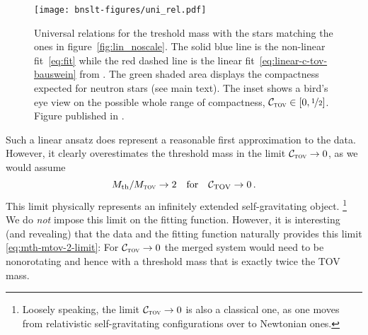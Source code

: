 \begin{figure}[t]
	\texttt{[image: bnslt-figures/uni\_rel.pdf]}
	\caption[
      Universal relations plot, 
	]{Universal relations for the treshold mass with the stars matching
	  the ones in figure~\protect\ref{fig:lin_noscale}. The solid blue line is
	  the non-linear fit~\protect\ref{eq:fit} while the red dashed line
	  is the linear fit~\protect\ref{eq:linear-c-tov-bauswein} from
	  \cite{Bauswein2013}. The green shaded area displays the compactness
	  expected for neutron stars (see main text).
	  The inset shows a bird's eye view on the possible whole range of
	  compactness, \ie $\mathcal{C}_{\textsc{tov}}\in[0, \nicefrac 12]$.
	  Figure published in \cite{Koeppel2019}.
	}
	\label{fig:uni_rel}
\end{figure}

Such a linear ansatz does represent a reasonable first approximation to
the data.  However, it clearly overestimates the threshold mass in the
limit $\mathcal{C}_{\textsc{tov}}\to0$, as we would assume
\begin{equation}\label{eq:mth-mtov-2-limit}
M_\textrm{th} / M_{\textsc{tov}} \to 2 \quad\text{for}\quad \mathcal{C}_{\rm{TOV}} \to 0 \,.
\end{equation}
This limit physically represents an infinitely extended self-gravitating
object. \footnote{
  Loosely speaking, the limit $\mathcal C_{\textsc{tov}} \to 0$ is also a
  classical one, as one moves from relativistic self-gravitating
  configurations over to Newtonian ones.
}
We do \emph{not} impose this limit on the fitting function. However, it
is interesting (and revealing) that the data and the
fitting function naturally provides this limit \eqref{eq:mth-mtov-2-limit}:
For $\mathcal C_{\textsc{tov}} \to 0$ the merged system would need to be nonorotating
and hence with a threshold mass that is exactly twice the TOV mass.

